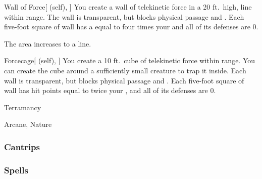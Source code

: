 \lowercase{\hypertarget{spell:Wall of Force}{}}\label{spell:Wall of Force}
\begin{attuneability}[Rank 5]{\hypertarget{spell:Wall of Force}{Wall of Force}}[ (self), ]
\targetrule
You create a wall of telekinetic force in a 20 ft.\ high, \arealarge line within \rngmed range.
The wall is transparent, but blocks physical passage and .
Each five-foot square of wall has a  equal to four times your  and all of its defenses are 0.

\rankline
{} The area increases to a \areahuge line.
\end{attuneability}
\vspace{0.25em}



\lowercase{\hypertarget{spell:Forcecage}{}}\label{spell:Forcecage}
\begin{attuneability}[Rank 8]{\hypertarget{spell:Forcecage}{Forcecage}}[ (self), ]
\targetrule
You create a 10 ft.\ cube of telekinetic force within \rngmed range.
You can create the cube around a sufficiently small creature to trap it inside.
Each wall is transparent, but blocks physical passage and .
Each five-foot square of wall has hit points equal to twice your , and all of its defenses are 0.
\end{attuneability}
\vspace{0.25em}


\newpage
\begin{spellsection}{Terramancy}

\begin{spellheader}
\end{spellheader}


 Arcane, Nature

\subsubsection{Cantrips}


\end{spellsection}


\subsubsection{Spells}


